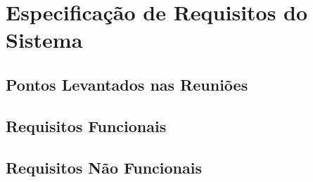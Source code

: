 \chapter{Especificação de Requisitos do Sistema}

\section{Pontos Levantados nas Reuniões}
\section{Requisitos Funcionais}
\section{Requisitos Não Funcionais}